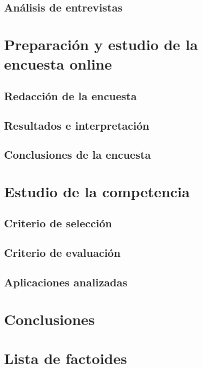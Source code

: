 \documentclass[12pt]{article}
\begin{document}
\subsection{Análisis de entrevistas}
\section{Preparación y estudio de la encuesta online}
\subsection{Redacción de la encuesta}
\subsection{Resultados e interpretación}
\subsection{Conclusiones de la encuesta}
\section{Estudio de la competencia}
\subsection{Criterio de selección}
\subsection{Criterio de evaluación}
\subsection{Aplicaciones analizadas}
\section{Conclusiones}
\section{Lista de factoides}
\end{document}

